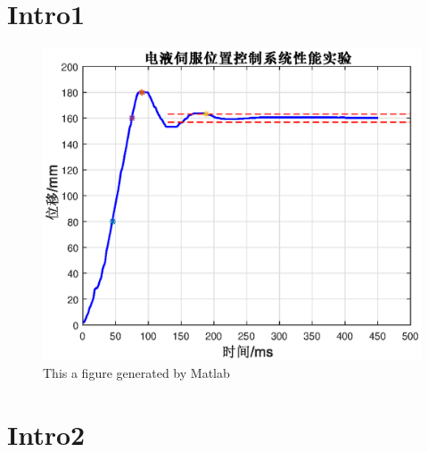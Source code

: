 \documentclass{book}
\numberwithin{equation}{section}  %
\begin{document}
\chapter{Intro1}
\begin{figure}
	\centering
	\includegraphics[width=0.7\linewidth]{valve}
	\caption[short]{This a figure generated by Matlab}
	\label{fig:valve}
\end{figure}

\chapter{Intro2}
\end{document}
